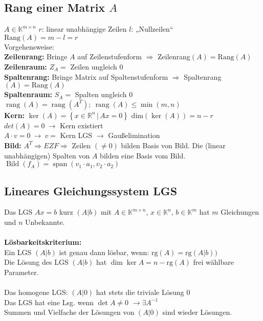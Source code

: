 \documentclass[6pt,a4paper]{scrartcl}
\newcommand{\dme}[2]{\ensuremath{\left\{#1\,\vert\,#2 \right\}}}
\begin{document}
\begin{multicols}{3}
\subsection{Rang einer Matrix $A$}
$A\in \mathbb K^{m\times n}$ \quad $r$: linear unabhängige Zeilen \quad $l$: „Nullzeilen“ \\ 
$\mathrm{Rang}(A)=m-l=r$\\  
Vorgehensweise: \\
\textbf{Zeilenrang:} Bringe $A$ auf Zeilenstufenform $\Rightarrow$ Zeilenrang$(A) = \mathrm{Rang}(A)$ \\
\textbf{Zeilenraum:}  $Z_A = $ Zeilen ungleich $0$ \\
\textbf{Spaltenrang:} Bringe Matrix auf Spaltenstufenform $\Rightarrow$ Spaltenrang$(A)= \mathrm{Rang}(A)$ \\
\textbf{Spaltenraum:} $S_A = $ Spalten ungleich $0$ \\
$\operatorname {rang}(A)=\operatorname {rang}(A^{T}); ~\operatorname{rang}(A)\leq \min(m,n)$ \\
\textbf{Kern:} $\ker(A) = \dme{x \in \mathbb R^n}{Ax= 0}$ \qquad $\mathrm{dim}(\ker(A))=n-r$ \\
\quad $det(A)=0 ~\rightarrow$ Kern existiert \\
	$A \cdot v=0 ~ \rightarrow ~ v=$ Kern \qquad LGS $\rightarrow$ Gaußelimination \\
\textbf{Bild: } $A^T \Rightarrow EZF \Rightarrow $ Zeilen $(\not= 0)$ bilden Basis von Bild. Die (linear unabhängigen) Spalten von $A$ bilden eine Basis vom Bild. $\operatorname{Bild}(f_A)=\operatorname{span}(v_1\cdot a_1,v_2\cdot a_2)$
\subsection{Lineares Gleichungssystem LGS}
Das LGS $Ax=b$ kurz $(A|b)$ mit $A\in \mathbb K^{m\times n}$, $x\in \mathbb K^n$, $b\in \mathbb K^m$ hat $m$ Gleichungen und $n$ Unbekannte.\\
\\
\textbf{Lösbarkeitskriterium:}\\
Ein LGS $(A|b)$ ist genau dann lösbar, wenn: $\mathrm{rg}(A)=\mathrm{rg}(A|b))$\\
Die Lösung des LGS $(A|b)$ hat $\dim{\ker A} = n-\mathrm{rg}(A)$ frei wählbare Parameter.\\
\\
Das homogene LGS: $(A|0)$ hat stets die triviale Lösung $0$\\
Das LGS hat eine Lsg. wenn $\det A \not= 0$ \quad $\rightarrow \exists A^{-1}$ \\
Summen und Vielfache der Lösungen von $(A|0)$ sind wieder Lösungen.


\end{multicols}
\end{document}
